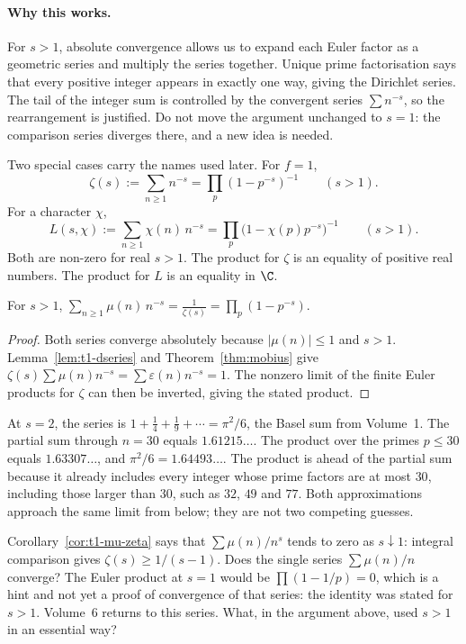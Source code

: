 \paragraph{Why this works.}
For $s>1$, absolute convergence allows us to expand each Euler factor as a geometric series and multiply the series together. Unique prime factorisation says that every positive integer appears in exactly one way, giving the Dirichlet series. The tail of the integer sum is controlled by the convergent series $\sum n^{-s}$, so the rearrangement is justified. Do not move the argument unchanged to $s=1$: the comparison series diverges there, and a new idea is needed.

Two special cases carry the names used later. For $f=1$,
\[
\zeta(s):=\sum_{n\ge1}n^{-s}=\prod_p(1-p^{-s})^{-1}\qquad(s>1).
\]
For a character $\chi$,
\[
L(s,\chi):=\sum_{n\ge1}\chi(n)\,n^{-s}=\prod_p\bigl(1-\chi(p)p^{-s}\bigr)^{-1}\qquad(s>1).
\]
\label{sym:Lseries}
Both are non-zero for real $s>1$. The product for $\zeta$ is an equality of positive real numbers. The product for $L$ is an equality in $\C$.

\begin{corollary}\label{cor:t1-mu-zeta}
For $s>1$, $\displaystyle\sum_{n\ge1}\mu(n)\,n^{-s}=\frac1{\zeta(s)}=\prod_p(1-p^{-s})$.
\end{corollary}
\begin{proof}
Both series converge absolutely because $|\mu(n)|\le1$ and $s>1$. Lemma~\ref{lem:t1-dseries} and Theorem~\ref{thm:mobius} give $\zeta(s)\sum\mu(n)n^{-s}=\sum\varepsilon(n)n^{-s}=1$. The nonzero limit of the finite Euler products for $\zeta$ can then be inverted, giving the stated product.
\end{proof}

\begin{examplex}
At $s=2$, the series is $1+\frac14+\frac19+\cdots=\pi^2/6$, the Basel sum from Volume~1. The partial sum through $n=30$ equals $1.61215\ldots$. The product over the primes $p\le30$ equals $1.63307\ldots$, and $\pi^2/6=1.64493\ldots$. The product is ahead of the partial sum because it already includes every integer whose prime factors are at most $30$, including those larger than $30$, such as $32$, $49$ and $77$. Both approximations approach the same limit from below; they are not two competing guesses.
\end{examplex}

\begin{think}
Corollary~\ref{cor:t1-mu-zeta} says that $\sum\mu(n)/n^s$ tends to zero as $s\downarrow1$: integral comparison gives $\zeta(s)\ge1/(s-1)$. Does the single series $\sum\mu(n)/n$ converge? The Euler product at $s=1$ would be $\prod(1-1/p)=0$, which is a hint and not yet a proof of convergence of that series: the identity was stated for $s>1$. Volume~6 returns to this series. What, in the argument above, used $s>1$ in an essential way?
\end{think}


